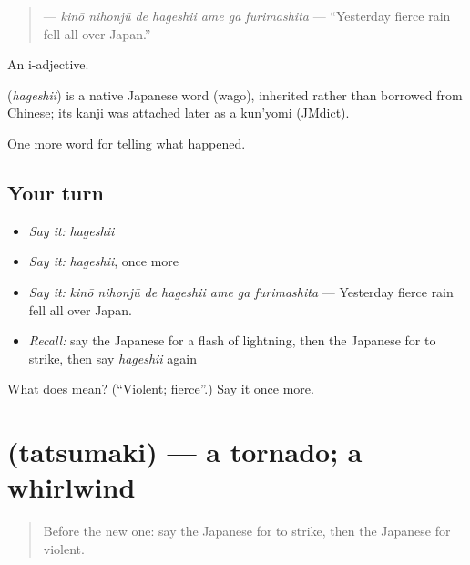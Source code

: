 \begin{quote}
\textbf{    } — \emph{kinō nihonjū de hageshii ame ga furimashita} — \textquotedblleft{}Yesterday fierce rain fell all over Japan.\textquotedblright{}
\end{quote}

An i-adjective.

\begin{cousinweb}
\textbf{} (\emph{hageshii}) is a native Japanese word (wago), inherited rather than borrowed from Chinese; its kanji was attached later as a kun'yomi (JMdict).
\end{cousinweb}

\begin{grammarlens}[title={What you've built}]
One more word for telling what happened.
\end{grammarlens}

\subsection*{Your turn}
\begin{itemize}
\raggedright
  \item \emph{Say it:} \emph{hageshii}
  \item \emph{Say it:} \emph{hageshii}, once more
  \item \emph{Say it:} \emph{kinō nihonjū de hageshii ame ga furimashita} — Yesterday fierce rain fell all over Japan.
  \item \emph{Recall:} say the Japanese for a flash of lightning, then the Japanese for to strike, then say \emph{hageshii} again
\end{itemize}

\begin{tcolorbox}[breakable,colback=teal!4,colframe=teal!35!black,title={Before you move on}]
What does  mean? (\textquotedblleft{}Violent; fierce\textquotedblright{}.) Say it once more.
\end{tcolorbox}
\section[\texorpdfstring{\ja{たつまき} (tatsumaki)}{たつまき (tatsumaki)}]{ (tatsumaki) — a tornado; a whirlwind}

\label{lesson:JA-C278-tatsumaki}



\begin{quote}
Before the new one: say the Japanese for to strike, then the Japanese for violent.
\end{quote}

